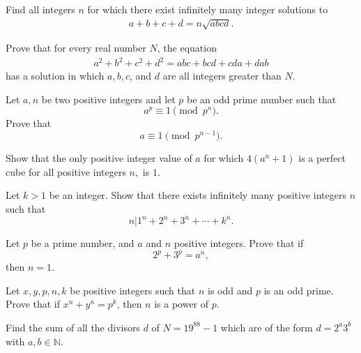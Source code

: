 \documentclass{subfile}
\begin{document}
	\begin{problem}[Vietnam 2002]
		Find all integers \(n\) for which there exist infinitely many integer solutions to
			\begin{align*}
				a + b + c + d = n \sqrt{ abcd }.
			\end{align*}
	\end{problem}

	\begin{problem}[Putnam 1933]
		Prove that for every real number $N$, the equation
			\begin{align*}
				a^2 + b^2 + c^2 + d^2 = abc + bcd + cda + dab
			\end{align*}
		has a solution in which $a, b, c$, and $d$ are all integers greater than $N$.
	\end{problem}

	\begin{problem}
		Let $a,n$ be two positive integers and let $p$ be an odd prime number such that
		\[a^p \equiv 1 \pmod{p^n}.\]
		Prove that
		\[a \equiv 1 \pmod{p^{n-1}}.\]
	\end{problem}

	\begin{problem}
		Show that the only positive integer value of $a$ for which $4(a^n+1)$ is a perfect cube for all positive integers $n,$ is $1.$
	\end{problem}

	\begin{problem}
		Let $k>1$ be an integer. Show that there exists infinitely many positive integers $n$ such that
		\[n | 1^n + 2^n +3^n +\cdots+k^n.\]
	\end{problem}


	\begin{problem}[Ireland 1996]
		Let $p$ be a prime number, and $a$ and $n$ positive integers. Prove that if
		\[2^p+3^p=a^n,\]
		then $n=1.$
	\end{problem}



	\begin{problem}[Russia 1996]
		Let $x, y, p, n, k$ be positive integers such that $n$ is odd and $p$ is an odd prime. Prove that if $x^n + y^n = p^k$, then $n$ is a power of $p$.
	\end{problem}

	\begin{problem}
		Find the sum of all the divisors $d$ of $N=19^{88}-1$ which are of the form $d=2^{a}3^{b}$ with  $a,b \in \mathbb N$.
	\end{problem}
\end{document}
